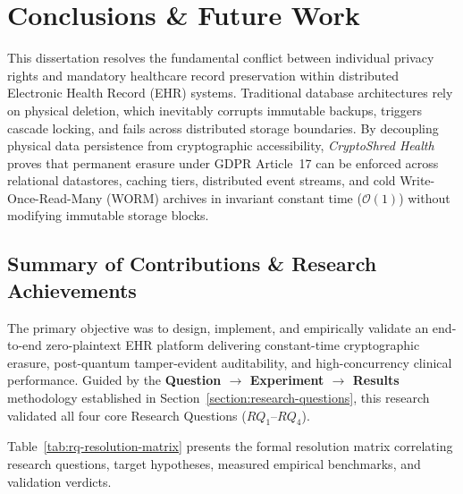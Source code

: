 
\chapter{Conclusions \& Future Work}\label{section:conclusions}

This dissertation resolves the fundamental conflict between individual privacy rights and mandatory healthcare record preservation within distributed Electronic Health Record (EHR) systems. Traditional database architectures rely on physical deletion, which inevitably corrupts immutable backups, triggers cascade locking, and fails across distributed storage boundaries. By decoupling physical data persistence from cryptographic accessibility, \textit{CryptoShred Health} proves that permanent erasure under GDPR Article~17 can be enforced across relational datastores, caching tiers, distributed event streams, and cold Write-Once-Read-Many (WORM) archives in invariant constant time ($\mathcal{O}(1)$) without modifying immutable storage blocks.


\section{Summary of Contributions \& Research Achievements}\label{section:contributions}

The primary objective was to design, implement, and empirically validate an end-to-end zero-plaintext EHR platform delivering constant-time cryptographic erasure, post-quantum tamper-evident auditability, and high-concurrency clinical performance. Guided by the \textbf{Question $\rightarrow$ Experiment $\rightarrow$ Results} methodology established in Section~\ref{section:research-questions}, this research validated all four core Research Questions ($RQ_1$--$RQ_4$).

Table~\ref{tab:rq-resolution-matrix} presents the formal resolution matrix correlating research questions, target hypotheses, measured empirical benchmarks, and validation verdicts.

